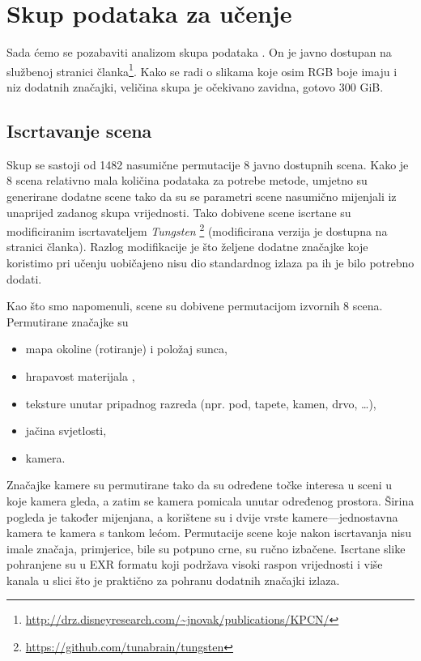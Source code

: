 \documentclass[times, utf8, seminar, numeric]{fer}
\begin{document}
\chapter{Skup podataka za učenje}
Sada ćemo se pozabaviti analizom skupa podataka . On je javno dostupan na službenoj
stranici članka\footnote{\url{http://drz.disneyresearch.com/~jnovak/publications/KPCN/}}. Kako
se radi o slikama koje osim RGB boje imaju i niz dodatnih značajki, veličina skupa je očekivano
zavidna, gotovo 300 GiB.

\section{Iscrtavanje scena}
Skup se sastoji od 1482 nasumične permutacije 8 javno dostupnih scena. Kako je 8 scena relativno
mala količina podataka za potrebe metode, umjetno su generirane dodatne scene tako da su se
parametri scene nasumično mijenjali iz unaprijed zadanog skupa vrijednosti. Tako dobivene scene
iscrtane su modificiranim iscrtavateljem \textit{Tungsten}\/
\footnote{\url{https://github.com/tunabrain/tungsten}} (modificirana verzija je dostupna na
stranici članka). Razlog modifikacije je što željene dodatne značajke koje koristimo pri učenju
uobičajeno nisu dio standardnog izlaza pa ih je bilo potrebno dodati.

Kao što smo napomenuli, scene su dobivene permutacijom izvornih 8 scena. Permutirane značajke su
\begin{itemize}
\item mapa okoline (rotiranje) i položaj sunca,
\item hrapavost materijala ,
\item teksture unutar pripadnog razreda (npr. pod, tapete, kamen, drvo, \ldots),
\item jačina svjetlosti,
\item kamera.
\end{itemize}
Značajke kamere su permutirane tako da su određene točke interesa u sceni u koje kamera
gleda, a zatim se kamera pomicala unutar određenog prostora. Širina pogleda 
je također mijenjana, a korištene su i dvije vrste kamere—jednostavna kamera 
te kamera s tankom lećom. Permutacije scene koje nakon iscrtavanja nisu imale značaja,
primjerice, bile su potpuno crne, su ručno izbačene. Iscrtane slike pohranjene su u EXR formatu
koji podržava visoki raspon vrijednosti i više kanala u slici što je praktično za pohranu
dodatnih značajki izlaza.
\end{document}

